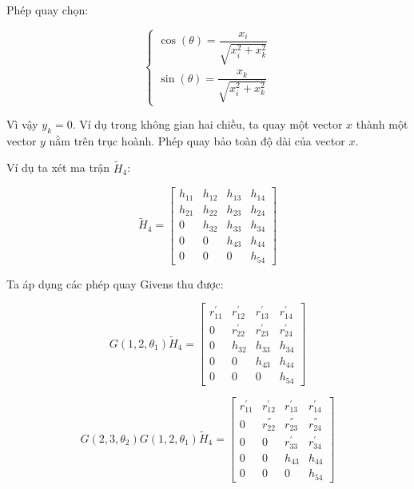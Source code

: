 \documentclass[14pt, a4paper]{article}
\numberwithin{equation}{section}
\numberwithin{algorithm}{section}
\numberwithin{figure}{section}
\numberwithin{dl}{section}
\numberwithin{md}{section}
\numberwithin{bd}{section}
\numberwithin{dn}{section}
\begin{document}
Phép quay chọn:

\begin{equation}
    \begin{cases}
        \cos(\theta) = \dfrac{x_i}{\sqrt{x_i^2 + x_k^2}} \\
        \sin(\theta) = \dfrac{x_k}{\sqrt{x_i^2 + x_k^2}}
    \end{cases}
\end{equation}

Vì vậy $y_k = 0$. Ví dụ trong không gian hai chiều, ta quay một vector $x$ thành một vector $y$ nằm trên trục hoành. Phép quay bảo toàn độ dài của vector $x$.

Ví dụ ta xét ma trận $\widetilde{H}_4$:

\begin{equation}
    \widetilde{H}_4 = \begin{bmatrix} h_{11} & h_{12} & h_{13} & h_{14} \\
                                    h_{21} & h_{22} & h_{23} & h_{24} \\
                                    0 & h_{32} & h_{33} & h_{34} \\
                                    0 & 0 & h_{43} & h_{44} \\
                                    0 & 0 & 0 & h_{54}  \end{bmatrix}
\end{equation}

Ta áp dụng các phép quay Givens thu được:

\begin{equation}
    G(1, 2, \theta_1) \widetilde{H}_4 = \begin{bmatrix} r_{11}^{'} & r_{12}^{'} & r_{13}^{'} & r_{14}^{'} \\
        0 & r_{22}^{'} & r_{23}^{'} & r_{24}^{'} \\
        0 & h_{32} & h_{33} & h_{34} \\
        0 & 0 & h_{43} & h_{44} \\
        0 & 0 & 0 & h_{54}  \end{bmatrix}
\end{equation}

\begin{equation}
    G(2, 3, \theta_2)G(1, 2, \theta_1) \widetilde{H}_4 = \begin{bmatrix} r_{11}^{'} & r_{12}^{'} & r_{13}^{'} & r_{14}^{'} \\
        0 & r_{22}^{''} & r_{23}^{''} & r_{24}^{''} \\
        0 & 0 & r_{33}^{'} & r_{34}^{'} \\
        0 & 0 & h_{43} & h_{44} \\
        0 & 0 & 0 & h_{54}  \end{bmatrix}
\end{equation}
\end{document}
